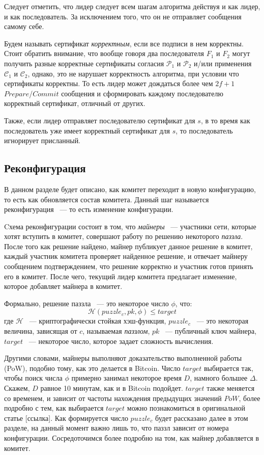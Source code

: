 Следует отметить, что лидер следует всем шагам алгоритма действуя и как лидер, и как последователь. За исключением того, что он не отправляет сообщения самому себе.

Будем называть сертификат \textit{корректным}, если все подписи в нем корректны.
Стоит обратить внимание, что вообще говоря два последователя $F_1$ и $F_2$ могут получить разные корректные сертификаты согласия $\mathcal{P}_1$ и $\mathcal{P}_2$ и/или применения $\mathcal{C}_1$ и $\mathcal{C}_2$, однако, это не нарушает корректность алгоритма, при условии что сертификаты корректны.
То есть лидер может дождаться более чем $2f+1$ $Prepare$/$Commit$ сообщения и сформировать каждому последователю корректный сертификат, отличный от других.

Также, если лидер отправляет последователю сертификат для $s$, в то время как последователь уже имеет корректный сертификат для $s$, то последователь игнорирует присланный.

\subsection{Реконфигурация}
В данном разделе будет описано, как комитет переходит в новую конфигурацию, то есть как обновляется состав комитета. Данный шаг называется реконфигурация ~--- то есть изменение конфигурации.

Cхема реконфигурации состоит в том, что \textit{майнеры} ~--- участники сети, которые хотят вступить в комитет, совершают работу по решению некоторого \textit{паззла}. После того как решение найдено, майнер публикует данное решение в комитет, каждый участник комитета проверяет найденное решение, и отвечает майнеру сообщением подтверждением, что решение корректно и участник готов принять его в комитет.
После чего, текущий лидер комитета предлагает изменение, которое добавляет майнера в комитет.

Формально, решение паззла ~--- это некоторое число $\phi$, что:
$$\mathcal{H}(puzzle_c, pk, \phi) \le target$$
где $\mathcal{H}$ ~--- криптографически стойкая хэш-функция, $puzzle_c$ ~--- это некоторая величина, зависящая от $c$, называемая \textit{паззлом}, $pk$ ~--- публичный ключ майнера, $target$ ~--- некоторое число, которое задает сложность вычисления.

Другими словами, майнеры выполняют доказательство выполненной работы (PoW), подобно тому, как это делается в Bitcoin.  Число $target$ выбирается так, чтобы поиск числа $\phi$ примерно занимал некоторое время $D$, намного большее $\Delta$. Скажем, $D$ равное 10 минутам, как и в Bitcoin подойдет.  $target$ также меняется со временем, и зависит от частоты нахождения предыдущих значений $PoW$, более подробно с тем, как выбирается $target$ можно познакомиться в оригинальной статье [ссылка].
Как формируется число $puzzle_c$ будет рассказано далее в этом разделе, на данный момент важно лишь то, что паззл зависит от номера конфигурации. Сосредоточимся более подробно на том, как майнер добавляется в комитет.


